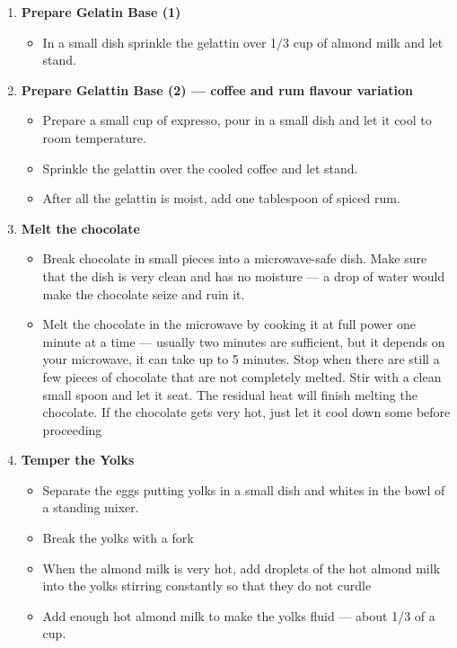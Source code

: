 \documentclass[11pt,letterpaper]{article}
\begin{document}
\begin{description}
\begin{enumerate}
	\item {\bf Prepare Gelatin Base (1)}
		\begin{itemize}
		\item In a small dish sprinkle the gelattin over 1/3 cup of almond milk and let stand.
		\end{itemize}
	\item {\bf Prepare Gelattin Base (2) --- coffee and rum flavour variation}
		\begin{itemize}
		\item Prepare a small cup of expresso, pour in a small dish and let it cool to room temperature.
		\item  Sprinkle the gelattin over the cooled coffee and let stand.
		\item After all the gelattin is moist, add one tablespoon of spiced rum.
		\end{itemize}	
	\item {\bf Melt the chocolate}
		\begin{itemize}
		\item Break chocolate in small pieces into a microwave-safe dish. Make sure that the dish is very clean and has no moisture --- a drop of water would make the chocolate seize and ruin it.
		\item Melt the chocolate in the microwave by cooking it at full power one minute at a time --- usually two minutes are sufficient, but it depends on your microwave, it can take up to 5 minutes. Stop when there are still a few pieces of chocolate that are not completely melted. Stir with a clean small spoon and let it seat. The residual heat will finish melting the chocolate. If the chocolate gets very hot, just let it cool down some before proceeding
		\end{itemize}
		
	\item {\bf Temper the Yolks}
		\begin{itemize}
		\item Separate the eggs putting yolks in a small dish and whites in the bowl of a standing mixer.
		\item Break the yolks with a fork
		\item When the almond milk is very hot, add droplets of the hot almond milk into the yolks stirring constantly so that they do not curdle
		\item Add enough hot almond milk to make the yolks fluid --- about 1/3 of a cup.
		\end{itemize}


\end{enumerate}
\end{description}
\end{document}

